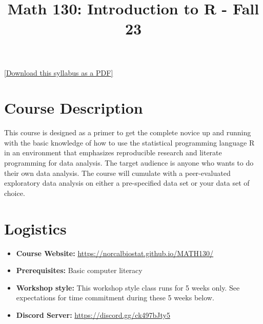 \documentclass[
  11pt,
]{article}
\title{Math 130: Introduction to R - Fall 23}
\author{}
\date{\vspace{-2.5em}}
\providecommand{\tightlist}{%
  \setlength{\itemsep}{0pt}\setlength{\parskip}{0pt}}
\begin{document}
\maketitle

\href{syllabus.pdf}{{[}Download this syllabus as a PDF{]}}

\hypertarget{course-description}{%
\section{Course Description}\label{course-description}}

This course is designed as a primer to get the complete novice up and
running with the basic knowledge of how to use the statistical
programming language R in an environment that emphasizes reproducible
research and literate programming for data analysis. The target audience
is anyone who wants to do their own data analysis. The course will
cumulate with a peer-evaluated exploratory data analysis on either a
pre-specified data set or your data set of choice.

\hypertarget{logistics}{%
\section{Logistics}\label{logistics}}

\begin{itemize}
\tightlist
\item
  \textbf{Course Website:}
  \url{https://norcalbiostat.github.io/MATH130/}
\item
  \textbf{Prerequisites:} Basic computer literacy
\item
  \textbf{Workshop style:} This workshop style class runs for 5 weeks
  only. See expectations for time commitment during these 5 weeks
  below.\\
\item
  \textbf{Discord Server:} \url{https://discord.gg/ck497bJty5}
\end{itemize}
\end{document}

